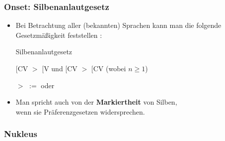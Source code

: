 \begin{frame}
\frametitle{Onset: Silbenanlautgesetz}

\begin{itemize}
	\item Bei Betrachtung aller (bekannten) Sprachen kann man die folgende Gesetzmäßigkeit feststellen \citep[cf.][212f.]{Hall00a}:
	
\medskip
	\begin{block}{Silbenanlautgesetz}
	
	\sub{$\sigma$}[CV $>$ \sub{$\sigma$}[V 
	und
	\sub{$\sigma$}[CV $>$ \sub{$\sigma$}[CV (wobei $n \geq 1$)
	
	$>$ $:=$  oder 

	
	\end{block}
\medskip
	 
	 \item Man spricht auch von der \textbf{Markiertheit} von Silben,\\
	 wenn sie Präferenzgesetzen widersprechen.

\end{itemize}

\end{frame}


\subsubsection{Nukleus}

